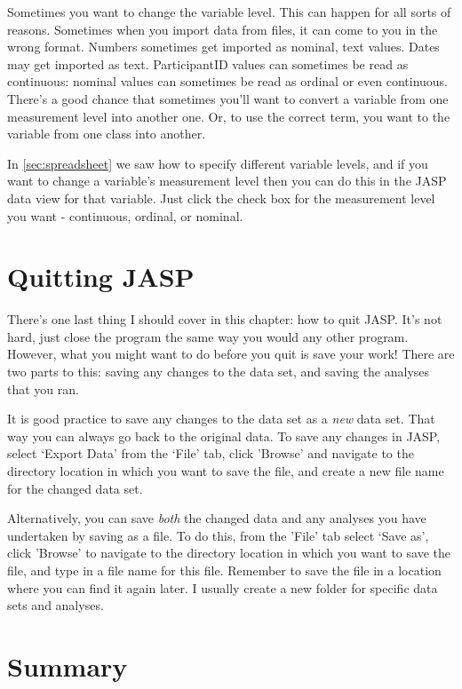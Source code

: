 Sometimes you want to change the variable level. This can happen for all sorts of reasons. Sometimes when you import data from files, it can come to you in the wrong format. Numbers sometimes get imported as nominal, text values. Dates may get imported as text. ParticipantID values can sometimes be read as continuous: nominal values can sometimes be read as ordinal or even continuous. There's a good chance that sometimes you'll want to convert a variable from one measurement level into another one. Or, to use the correct term, you want to  the variable from one class into another. 

In \ref{sec:spreadsheet} we saw how to specify different variable levels, and if you want to change a variable's measurement level then you can do this in the JASP data view for that variable. Just click the check box for the measurement level you want - continuous, ordinal, or nominal. 


\section{Quitting JASP \label{sec:quittingjasp}}

There's one last thing I should cover in this chapter: how to quit JASP. It's not hard, just close the program the same way you would any other program. However, what you might want to do before you quit is save your work! There are two parts to this: saving any changes to the data set, and saving the analyses that you ran.

It is good practice to save any changes to the data set as a {\it new} data set. That way you can always go back to the original data. To save any changes in JASP, select `Export Data' from the `File' tab, click 'Browse' and navigate to the directory location in which you want to save the file, and create a new file name for the changed data set.

Alternatively, you can save {\it both} the changed data and any analyses you have undertaken by saving as a  file. To do this, from the 'File' tab select `Save as', click 'Browse' to navigate to the directory location in which you want to save the file, and type in a file name for this  file. Remember to save the file in a location where you can find it again later. I usually create a new folder for specific data sets and analyses.  


\section{Summary}

